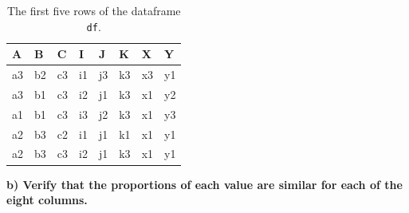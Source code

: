 \documentclass{article}
\begin{document}
\begin{table}[htbp!]
    \centering
    \caption{The first five rows of the dataframe \texttt{df}.}
    
    \vspace{0.5\baselineskip}
    \begin{tabular}{@{}llllllll@{}}
        \toprule
        A                              & B                              & C                              & I                              & J                              & K                              & X                              & Y                              \\ \midrule
        a3                             & b2                             & c3                             & i1                             & j3                             & k3                             & x3                             & y1                             \\
        a3                             & b1                             & c3                             & i2                             & j1                             & k3                             & x1                             & y2                             \\
        a1                             & b1                             & c3                             & i3                             & j2                             & k3                             & x1                             & y3                             \\
        a2                             & b3                             & c2                             & i1                             & j1                             & k1                             & x1                             & y1                             \\
        a2                             & b3                             & c3                             & i2                             & j1                             & k3                             & x1                             & y1                             \\ \bottomrule
    \end{tabular}
    \label{tbl:df_head}
\end{table}

\textbf{b) Verify that the proportions of each value are similar for each of the eight columns.}

\vspace{\baselineskip}
\end{document}
